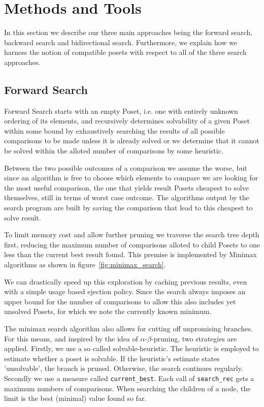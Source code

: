 \documentclass[10pt,journal,compsoc]{IEEEtran}
\begin{document}
\section{Methods and Tools}
In this section we describe our three main approaches being the forward search, backward search and bidirectional search. Furthermore, we explain how we harness the notion of compatible posets with respect to all of the three search approaches.

\subsection{Forward Search}\label{chapter:forward_search}
Forward Search starts with an empty Poset, i.e. one with entirely unknown ordering of its elements,
and recursively determines solvability of a given Poset within some bound by exhaustively searching
the results of all possible comparisons to be made unless it is already solved or we determine that
it cannot be solved within the alloted number of comparisons by some heuristic.

Between the two possible outcomes of a comparison we assume the worse, but since an algorithm is
free to choose which elements to compare we are looking for the most useful comparison, the one that
yields result Posets cheapest to solve themselves, still in terms of worst case outcome. The
algorithms output by the search program are built by saving the comparison that lead to this
cheapest to solve result.

To limit memory cost and allow further pruning we traverse the search tree depth first, reducing the
maximum number of comparisons alloted to child Posets to one less than the current best result
found. This premise is implemented by Minimax algorithms as shown in
figure~\ref{fig:minimax_search}.

We can drastically speed up this exploration by caching previous results, even with a simple usage
based ejection policy. Since the search always imposes an upper bound for the number of comparisons
to allow this also includes yet unsolved Posets, for which we note the currently known minimum.

The minimax search algorithm also allows for cutting off unpromising branches. For this means, and inspired by the idea of $\alpha$-$\beta$-pruning, two strategies are applied.
Firstly, we use a so called solvable-heuristic.
The heuristic is employed to estimate whether a poset is solvable. If the heuristic's estimate states 'unsolvable', the branch is pruned.
Otherwise, the search continues regularly.
Secondly we use a measure called \texttt{current\_best}.
Each call of \texttt{search\_rec} gets a maximum numbers of comparisons. When searching the children of a node, the limit is the best (minimal) value found so far.
\end{document}
